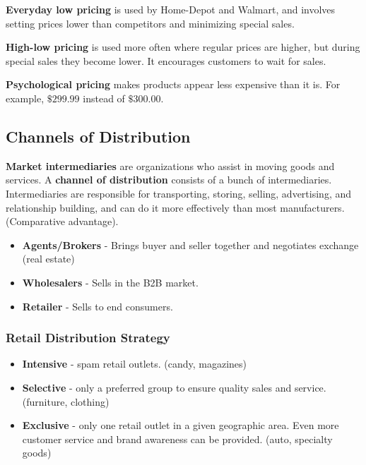 \documentclass[english, 12pt]{article}
\begin{document}
\begin{defn}[EDLP]
\textbf{Everyday low pricing} is used by Home-Depot and Walmart, and involves setting prices lower than competitors and minimizing special sales.
\end{defn}
\begin{defn}
\textbf{High-low pricing} is used more often where regular prices are higher, but during special sales they become lower. It encourages customers to wait for sales.
\end{defn}
\begin{defn}
\textbf{Psychological pricing} makes products appear less expensive than it is. For example, $\$299.99$ instead of $\$300.00$.
\end{defn}
\subsection{Channels of Distribution}
\begin{defn}
\textbf{Market intermediaries} are organizations who assist in moving goods and services. A \textbf{channel of distribution} consists of a bunch of intermediaries. Intermediaries are responsible for transporting, storing, selling, advertising, and relationship building, and can do it more effectively than most manufacturers. (Comparative advantage).
\end{defn}
\begin{itemize}
\item \textbf{Agents/Brokers} - Brings buyer and seller together and negotiates exchange (real estate)
\item \textbf{Wholesalers} - Sells in the B2B market.
\item \textbf{ Retailer} - Sells to end consumers.
\end{itemize}
\subsubsection*{Retail Distribution Strategy}
\begin{itemize}
\item \textbf{Intensive} - spam retail outlets. (candy, magazines)
\item \textbf{Selective} - only a preferred group to ensure quality sales and service. (furniture, clothing)
\item \textbf{Exclusive} - only one retail outlet in a given geographic area. Even more customer service and brand awareness can be provided. (auto, specialty goods)
\end{itemize}
\end{document}
